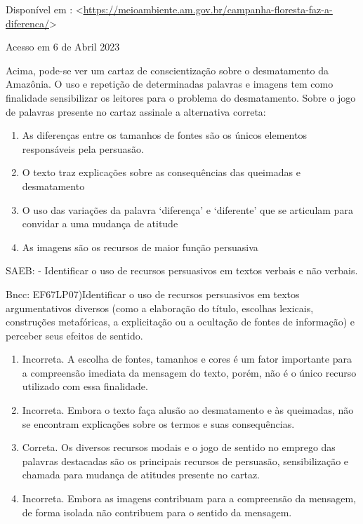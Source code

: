 {{\begin{escolha}
{\begin{itemize}
\begin{itemize}
Disponível em :
\textless{}\href{https://meioambiente.am.gov.br/campanha-floresta-faz-a-diferenca/}{\uline{https://meioambiente.am.gov.br/campanha-floresta-faz-a-diferenca/}}\textgreater{}

Acesso em 6 de Abril 2023

Acima, pode-se ver um cartaz de conscientização sobre o desmatamento da
Amazônia. O uso e repetição de determinadas palavras e imagens tem como
finalidade sensibilizar os leitores para o problema do desmatamento.
Sobre o jogo de palavras presente no cartaz assinale a alternativa
correta:

\begin{enumerate}
\def\labelenumi{\alph{enumi})}
\item
  As diferenças entre os tamanhos de fontes são os únicos elementos
  responsáveis pela persuasão.
\item
  O texto traz explicações sobre as consequências das queimadas e
  desmatamento
\item
  O uso das variações da palavra `diferença' e `diferente' que se
  articulam para convidar a uma mudança de atitude
\item
  As imagens são os recursos de maior função persuasiva
\end{enumerate}

SAEB: - Identificar o uso de recursos persuasivos em textos verbais e
não verbais.

Bncc: EF67LP07)Identificar o uso de recursos persuasivos em textos
argumentativos diversos (como a elaboração do título, escolhas lexicais,
construções metafóricas, a explicitação ou a ocultação de fontes de
informação) e perceber seus efeitos de sentido.

\begin{enumerate}
\def\labelenumi{\arabic{enumi}.}
\item
  Incorreta. A escolha de fontes, tamanhos e cores é um fator importante
  para a compreensão imediata da mensagem do texto, porém, não é o único
  recurso utilizado com essa finalidade.
\item
  Incorreta. Embora o texto faça alusão ao desmatamento e às queimadas,
  não se encontram explicações sobre os termos e suas consequências.
\item
  Correta. Os diversos recursos modais e o jogo de sentido no emprego
  das palavras destacadas são os principais recursos de persuasão,
  sensibilização e chamada para mudança de atitudes presente no cartaz.
\item
  Incorreta. Embora as imagens contribuam para a compreensão da
  mensagem, de forma isolada não contribuem para o sentido da mensagem.
\end{enumerate}


\end{itemize}
\end{itemize}}
\end{escolha}}}
